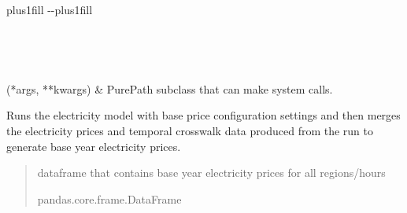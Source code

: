 \documentclass[letterpaper,10pt,english]{sphinxmanual}
\begin{document}
\begin{savenotes}
\sphinxatlongtablestart
\sphinxthistablewithglobalstyle
\sphinxthistablewithnovlinesstyle
\makeatletter
  \LTleft \@totalleftmargin plus1fill
  \LTright\dimexpr\columnwidth-\@totalleftmargin-\linewidth\relax plus1fill
\makeatother
\begin{longtable}{}
\sphinxtoprule
\endfirsthead

\\
\sphinxtoprule
\endhead

\sphinxbottomrule
{}\\
\endfoot

\endlastfoot
\sphinxtableatstartofbodyhook

\sphinxAtStartPar
{}(*args, **kwargs)
&
\sphinxAtStartPar
PurePath subclass that can make system calls.
\\
\sphinxbottomrule
\end{longtable}
\sphinxtableafterendhook
\sphinxatlongtableend
\end{savenotes}

\begin{fulllineitems}
\label{\detokenize{src.models.residential.preprocessor.generate_inputs:src.models.residential.preprocessor.generate_inputs.base_price}}
\pysigstartsignatures
\pysiglinewithargsret
{}
{}
{}
\pysigstopsignatures
\sphinxAtStartPar
Runs the electricity model with base price configuration settings and then
merges the electricity prices and temporal crosswalk data produced from the run
to generate base year electricity prices.
\begin{quote}\begin{description}
\sphinxAtStartPar
dataframe that contains base year electricity prices for all regions/hours

\sphinxAtStartPar
pandas.core.frame.DataFrame

\end{description}\end{quote}

\end{fulllineitems}
\end{document}
